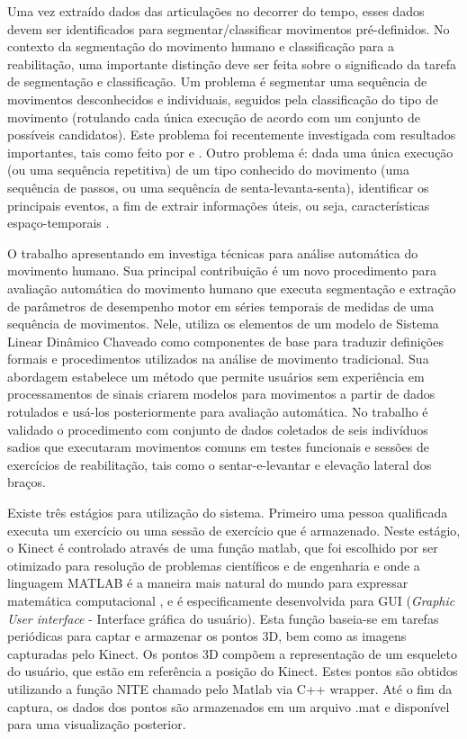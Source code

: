 Uma vez extraído dados das articulações no decorrer do tempo, esses dados devem ser identificados para segmentar/classificar movimentos pré-definidos.
  No contexto da segmentação do movimento humano e classificação para a reabilitação,
uma importante distinção deve ser feita sobre o significado da tarefa de segmentação e classificação.
Um problema é segmentar uma sequência de movimentos desconhecidos e
individuais, seguidos pela classificação do tipo de movimento (rotulando cada única
 execução de acordo com um conjunto de possíveis candidatos).
Este problema foi recentemente investigada com resultados importantes, tais como
feito por \cite{LinaAndDkulic} e \cite{PdeDios}. Outro problema é: dada uma única
execução (ou uma sequência repetitiva) de um tipo conhecido do movimento
 (uma sequência de passos, ou uma sequência de senta-levanta-senta), identificar os principais eventos,
a fim de extrair informações úteis, ou seja, características espaço-temporais \cite{roberto}.

O trabalho apresentando em \cite{roberto} investiga técnicas para análise automática
do movimento humano. Sua principal contribuição é um novo procedimento para avaliação
automática do movimento humano que executa segmentação e extração de parâmetros de
desempenho motor em séries temporais de medidas de uma sequência de movimentos. Nele,
utiliza os elementos de um modelo de Sistema Linear Dinâmico Chaveado como componentes
 de base para traduzir definições formais e procedimentos utilizados na análise de
movimento tradicional. Sua abordagem estabelece um método que permite usuários sem
experiência em processamentos de sinais criarem modelos para movimentos a partir de dados rotulados e usá-los posteriormente para avaliação automática. No trabalho é validado o
procedimento com conjunto de dados coletados de seis indivíduos sadios que executaram
movimentos comuns em testes funcionais e sessões de exercícios de reabilitação, tais como
o sentar-e-levantar e elevação lateral dos braços.

Existe três estágios para utilização do sistema. Primeiro uma pessoa qualificada
executa um exercício ou uma sessão de exercício que é armazenado. Neste estágio,
o Kinect é controlado através de uma função matlab, que foi escolhido por ser otimizado para resolução de problemas científicos e de engenharia e onde
 a linguagem MATLAB é a maneira mais natural do mundo para expressar matemática computacional \cite{matlab}, e é especificamente desenvolvida
para GUI (\textit{Graphic User interface} - Interface gráfica do usuário). Esta
função baseia-se em tarefas periódicas para captar e armazenar os pontos 3D, bem
como as imagens capturadas pelo Kinect. Os pontos 3D compõem a representação de
um esqueleto do usuário, que estão em referência a posição do Kinect. Estes pontos
são obtidos utilizando a função NITE \cite{openNI} chamado pelo Matlab via C++
wrapper. Até o fim da captura, os dados dos pontos são armazenados em um arquivo
.mat e disponível para uma visualização posterior.

